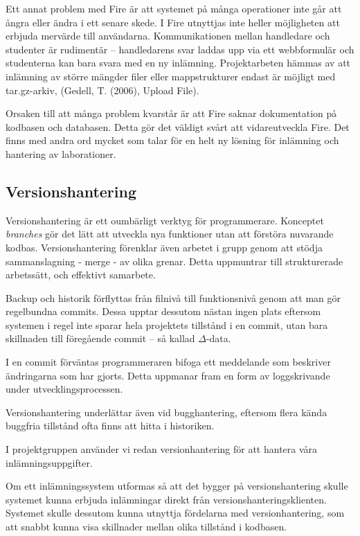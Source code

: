 Ett annat problem med Fire är att systemet på många operationer inte går att ångra eller ändra i ett senare skede. 
I Fire utnyttjas inte heller möjligheten att erbjuda mervärde till användarna. Kommunikationen mellan handledare och studenter är rudimentär – handledarens svar laddas upp via ett webbformulär och studenterna kan bara svara med en ny inlämning. Projektarbeten hämmas av att inlämning av större mängder filer eller mappstrukturer endast är möjligt med tar.gz-arkiv, (Gedell, T. (2006), Upload File).

Orsaken till att många problem kvarstår är att Fire saknar dokumentation på kodbasen och databasen. Detta gör det väldigt svårt att vidareutveckla Fire.
Det finns med andra ord mycket som talar för en helt ny lösning för inlämning och hantering av laborationer.

\subsection{Versionshantering}

Versionshantering är ett oumbärligt verktyg för programmerare. Konceptet \emph{branches} gör det lätt att utveckla nya funktioner utan att förstöra nuvarande kodbas. Versionshantering förenklar även arbetet i grupp genom att  stödja sammanslagning - merge - av olika grenar. Detta uppmuntrar till strukturerade arbetssätt, och effektivt samarbete. 

Backup och historik förflyttas från filnivå till funktionsnivå genom att man gör regelbundna commits. Dessa upptar dessutom nästan ingen plats eftersom systemen i regel inte sparar hela projektets tillstånd i en commit, utan bara skillnaden till föregående commit – så kallad $\Delta$-data.

I en commit förväntas programmeraren bifoga ett meddelande som beskriver ändringarna som har gjorts. Detta uppmanar fram en form av loggskrivande under utvecklingsprocessen.

Versionshantering underlättar även vid bugghantering, eftersom flera kända buggfria tillstånd ofta finns att hitta i historiken.

I projektgruppen använder vi redan versionhantering för att hantera våra inlämningsuppgifter.

Om ett inlämningssystem utformas så att det bygger på versionshantering skulle systemet kunna erbjuda inlämningar direkt från versionshanteringsklienten. Systemet skulle dessutom kunna utnyttja fördelarna med versionhantering, som att snabbt kunna visa skillnader mellan olika tillstånd i kodbasen.

